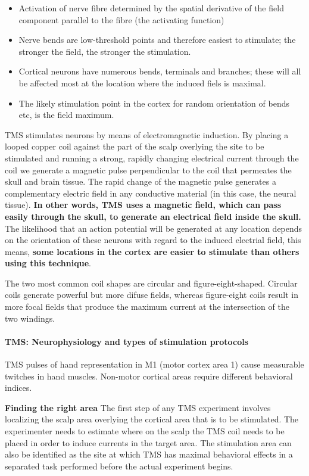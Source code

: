 \documentclass[12pt,article,oneside,a4paper]{memoir}
\begin{document}
\begin{itemize}
\item Activation of nerve fibre determined by the spatial derivative of the field
component parallel to the fibre (the activating function)
\item Nerve bends are low-threshold points and therefore easiest to stimulate; 
the stronger the field, the stronger the stimulation.
\item Cortical neurons have numerous bends, terminals and branches; these will all
be affected most at the location where the induced fiels is maximal.
\item The likely stimulation point in the cortex for random orientation of bends etc,
is the field maximum.
\end{itemize}

TMS stimulates neurons by means of electromagnetic induction.
By placing a looped copper coil against the part of the scalp overlying the site
to be stimulated and running a strong, rapidly changing electrical current through
the coil we generate a magnetic pulse perpendicular to the coil that permeates the
skull and brain tissue. The rapid change of the magnetic pulse generates a 
complementary electric field in any conductive material (in this case, the neural
tissue). \textbf{In other words, TMS uses a magnetic field, which can pass easily
through the skull, to generate an electrical field inside  the skull.}
The likelihood that an action potential will be generated at any location depends
on the orientation of these neurons with regard to the induced electrial field,
this means, \textbf{some locations in the cortex are easier to stimulate than others
using this technique}.

The two most common coil shapes are circular and figure-eight-shaped. Circular coils
generate powerful but more difuse fields, whereas figure-eight coils result in more 
focal fields that produce the maximum current at the intersection of the two windings.

\paragraph{TMS: Neurophysiology and types of stimulation protocols}
TMS pulses of hand representation in M1 (motor cortex area 1) cause measurable 
twitches in hand muscles. Non-motor cortical areas require different behavioral indices.

\textbf{Finding the right area} The first step of any TMS experiment involves localizing
the scalp area overlying the cortical area that is to be stimulated. The experimenter
needs to estimate where on the scalp the TMS coil needs to be placed in order to induce
currents in the target area. The stimulation area can also be identified as the site at
which TMS has maximal behavioral effects in a separated task performed before the actual
experiment begins.
\end{document}
